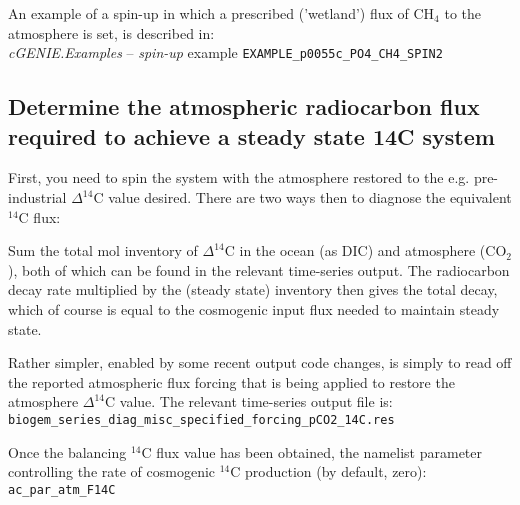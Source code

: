 \documentclass[10pt,twoside]{article}
\begin{document}
An example of a spin-up in which a prescribed ('wetland') flux of CH\(_{4}\) to the atmosphere is set, is described in:\\ \textit{cGENIE.Examples} -- \textit{spin-up} example \texttt{EXAMPLE\_p0055c\_PO4\_CH4\_SPIN2}


\subsection{Determine the atmospheric radiocarbon flux required to achieve a steady state 14C system}

First, you need to spin the system with the atmosphere restored to the e.g. pre-industrial \(\Delta^{14}\)C value desired. There are two ways then to diagnose the equivalent \(^{14}\)C flux:

\begin{compactenum}

\item Sum the total mol inventory of \(\Delta^{14}\)C in the ocean (as DIC) and atmosphere (CO\(_{2}\)), both of which can be found in the relevant time-series output. The radiocarbon decay rate multiplied by the (steady state) inventory then gives the total decay, which of course is equal to the cosmogenic input flux needed to maintain steady state.

\item Rather simpler, enabled by some recent output code changes, is simply to read off the reported atmospheric flux forcing that is being applied to restore the atmosphere \(\Delta^{14}\)C value. The relevant time-series output file is:
\\\texttt{biogem\_series\_diag\_misc\_specified\_forcing\_pCO2\_14C.res}

\end{compactenum}

Once the balancing \(^{14}\)C flux value has been obtained,  the namelist parameter controlling the rate of cosmogenic \(^{14}\)C production (by default, zero): \texttt{ac\_par\_atm\_F14C}

\end{document}
